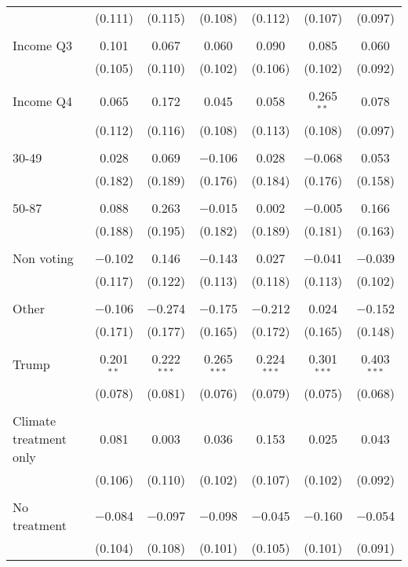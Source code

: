 \begin{tabular}{@{\extracolsep{5pt}}lcccccc}
  & (0.111) & (0.115) & (0.108) & (0.112) & (0.107) & (0.097) \\ 
  & & & & & & \\ 
 Income Q3 & 0.101 & 0.067 & 0.060 & 0.090 & 0.085 & 0.060 \\ 
  & (0.105) & (0.110) & (0.102) & (0.106) & (0.102) & (0.092) \\ 
  & & & & & & \\ 
 Income Q4 & 0.065 & 0.172 & 0.045 & 0.058 & 0.265$^{**}$ & 0.078 \\ 
  & (0.112) & (0.116) & (0.108) & (0.113) & (0.108) & (0.097) \\ 
  & & & & & & \\ 
 30-49 & 0.028 & 0.069 & $-$0.106 & 0.028 & $-$0.068 & 0.053 \\ 
  & (0.182) & (0.189) & (0.176) & (0.184) & (0.176) & (0.158) \\ 
  & & & & & & \\ 
 50-87 & 0.088 & 0.263 & $-$0.015 & 0.002 & $-$0.005 & 0.166 \\ 
  & (0.188) & (0.195) & (0.182) & (0.189) & (0.181) & (0.163) \\ 
  & & & & & & \\ 
 Non voting & $-$0.102 & 0.146 & $-$0.143 & 0.027 & $-$0.041 & $-$0.039 \\ 
  & (0.117) & (0.122) & (0.113) & (0.118) & (0.113) & (0.102) \\ 
  & & & & & & \\ 
 Other & $-$0.106 & $-$0.274 & $-$0.175 & $-$0.212 & 0.024 & $-$0.152 \\ 
  & (0.171) & (0.177) & (0.165) & (0.172) & (0.165) & (0.148) \\ 
  & & & & & & \\ 
 Trump & 0.201$^{**}$ & 0.222$^{***}$ & 0.265$^{***}$ & 0.224$^{***}$ & 0.301$^{***}$ & 0.403$^{***}$ \\ 
  & (0.078) & (0.081) & (0.076) & (0.079) & (0.075) & (0.068) \\ 
  & & & & & & \\ 
 Climate treatment only & 0.081 & 0.003 & 0.036 & 0.153 & 0.025 & 0.043 \\ 
  & (0.106) & (0.110) & (0.102) & (0.107) & (0.102) & (0.092) \\ 
  & & & & & & \\ 
 No treatment & $-$0.084 & $-$0.097 & $-$0.098 & $-$0.045 & $-$0.160 & $-$0.054 \\ 
  & (0.104) & (0.108) & (0.101) & (0.105) & (0.101) & (0.091) \\ 

\end{tabular}

